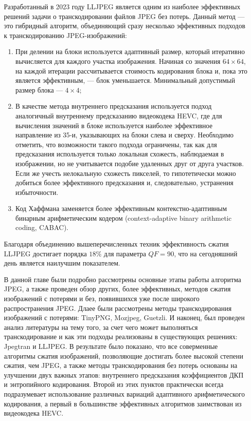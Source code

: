 \documentclass[times,specification,annotation]{itmo-student-thesis}
\begin{document}
Разработанный в 2023 году LLJPEG является одним из наиболее эффективных решений задачи о транскодировании файлов JPEG без потерь. Данный метод --- это гибридный алгоритм, объединяющий сразу несколько эффективных подходов к транскодированию JPEG-изображений:
\begin{enumerate}
    \item При делении на блоки используется адаптивный размер, который итеративно вычисляется для каждого участка изображения. Начиная со значения $64\times64$, на каждой итерации рассчитывается стоимость кодирования блока и, пока это является эффективным, --- блок уменьшается. Минимальный допустимый размер блока --- $4\times4$;
    \item В качестве метода внутреннего предсказания используется подход аналогичный внутреннему предсказанию видеокодека HEVC, где для вычисления значений в блоке используется наиболее эффективное направление из 35-и, указывающих на блоки слева и сверху. Необходимо отметить, что возможности такого подхода ограничены, так как для предсказания используется только локальная схожесть, наблюдаемая в изображении, но не учитывается подобие удаленных друг от друга участков. Если же учесть нелокальную схожесть пикселей, то гипотетически можно добиться более эффективного предсказания и, следовательно, устранения избыточности.
    \item Код Хаффмана заменяется более эффективным контекстно-адаптивным бинарным арифметическим кодером (context-adaptive binary arithmetic coding, CABAC).
\end{enumerate}

Благодаря объединению вышеперечисленных техник эффективность сжатия LLJPEG достигает порядка $18\%$ для параметра $QF=90$, что на сегодняшний день является наилучшим показателем.

\chapterconclusion

В данной главе были подробно рассмотрены основные этапы работы алгоритма JPEG, а также проведен обзор других, более эффективных, методов сжатия изображений с потерями и без, появившихся уже после широкого распространения JPEG. Длаее были рассмотрены методы транскодирования изображений с потерями: TinyPNG, Mozjpeg, Guetzli. И наконец, был проведен анализ литературы на тему того, за счет чего может выполняться транскодирование и как эти подходы реализованы в существующих решениях: Jpegtran и LLJPEG. В результате было показано, что все соверменные алгоритмы сжатия изображений, позволяющие достигать более высокой степени сжатия, чем JPEG, а также методы транскодирования без потерь основаны на улучшении двух важных этапов: внутреннего предсказания коэффициентов ДКП и энтропийного кодирования. Второй из этих пунктов практически всегда подразумевает использование различных вариаций адаптивного арифметического кодирования, а первый в большинстве эффективных алгоритмов заимствован из видеокодека HEVC.
\end{document}
